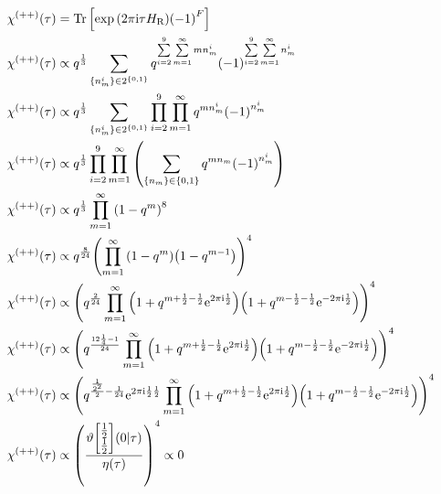 \begin{align*}
    \chi^{(++)}\qty(\tau)&=\Tr\qty[\exp\qty(2\pi\im\tau H_{\textnormal{R}})\qty(-1)^F]\\
    \chi^{(++)}\qty(\tau)&\propto q^{\frac13}\sum\limits_{\qty{n_m^i}\in 2^{\qty{0,1}}}q^{\sum\limits_{i=2}^9\sum\limits_{m=1}^\infty mn_m^i}\qty(-1)^{\sum\limits_{i=2}^9\sum\limits_{m=1}^\infty n_m^i} \\
    \chi^{(++)}\qty(\tau)&\propto q^{\frac13}\sum\limits_{\qty{n_m^i}\in 2^{\qty{0,1}}}\prod\limits_{i=2}^9\prod\limits_{m=1}^\infty q^{ mn_m^i}\qty(-1)^{n_m^i} \\
    \chi^{(++)}\qty(\tau)&\propto q^{\frac13}\prod\limits_{i=2}^9\prod\limits_{m=1}^\infty\qty(\sum\limits_{\qty{n_m}\in\qty{0,1}} q^{ mn_m}\qty(-1)^{n_m^i} )\\
    \chi^{(++)}\qty(\tau)&\propto q^{\frac13}\prod\limits_{m=1}^\infty\qty(1-q^m )^8\\
    \chi^{(++)}\qty(\tau)&\propto q^{\frac{8}{24}}\qty(\prod\limits_{m=1}^\infty\qty(1-q^m )\qty(1-q^{m-1} ))^4\\
    \chi^{(++)}\qty(\tau)&\propto \qty(q^{\frac{2}{24}}\prod\limits_{m=1}^\infty\qty(1+q^{m+\frac12-\frac12}\e^{2\pi\im\frac12} )\qty(1+q^{m-\frac12-\frac12}\e^{-2\pi\im\frac12} ))^4\\
    \chi^{(++)}\qty(\tau)&\propto \qty(q^{\frac{12\frac14-1}{24}}\prod\limits_{m=1}^\infty\qty(1+q^{m+\frac12-\frac12}\e^{2\pi\im\frac12} )\qty(1+q^{m-\frac12-\frac12}\e^{-2\pi\im\frac12} ))^4\\
    \chi^{(++)}\qty(\tau)&\propto \qty(q^{\frac{\frac{1}{2^2}}{2}-\frac{1}{24}}\e^{2\pi\im\frac12\frac12}\prod\limits_{m=1}^\infty\qty(1+q^{m+\frac12-\frac12}\e^{2\pi\im\frac12} )\qty(1+q^{m-\frac12-\frac12}\e^{-2\pi\im\frac12} ))^4\\
    \chi^{(++)}\qty(\tau)&\propto \qty(\frac{\vartheta\mqty[\frac12\\ \frac12]\qty(0|\tau)}{\eta\qty(\tau)})^4\propto 0
\end{align*}

\probitem{}

